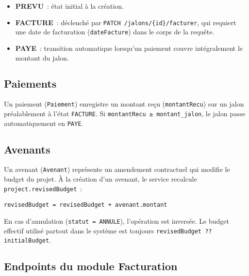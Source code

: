 \begin{itemize}
  \item \textbf{PREVU}~: état initial à la création.
  \item \textbf{FACTURE}~: déclenché par \texttt{PATCH /jalons/\{id\}/facturer}, qui requiert une
        date de facturation (\texttt{dateFacture}) dans le corps de la requête.
  \item \textbf{PAYE}~: transition automatique lorsqu'un paiement couvre intégralement le montant
        du jalon.
\end{itemize}

\subsection{Paiements}

Un paiement (\texttt{Paiement}) enregistre un montant reçu (\texttt{montantRecu}) sur un jalon
préalablement à l'état \texttt{FACTURE}. Si \texttt{montantRecu ≥ montant\_jalon}, le jalon passe
automatiquement en \texttt{PAYE}.

\subsection{Avenants}

Un avenant (\texttt{Avenant}) représente un amendement contractuel qui modifie le budget du projet.
À la création d'un avenant, le service recalcule \texttt{project.revisedBudget}~:

\begin{verbatim}
revisedBudget = revisedBudget + avenant.montant
\end{verbatim}

En cas d'annulation (\texttt{statut = ANNULE}), l'opération est inversée. Le budget effectif
utilisé partout dans le système est toujours \texttt{revisedBudget ?? initialBudget}.

\subsection{Endpoints du module Facturation}

